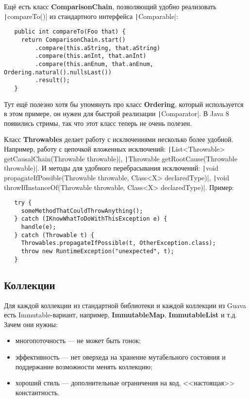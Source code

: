 \documentclass[a5paper,draft]{article}
\begin{document}
Ещё есть класс \textbf{ComparisonChain}, позволяющий удобно реализовать \texttt|compareTo()| из стандартного интерфейса \texttt|Comparable|:

\begin{verbatim}
   public int compareTo(Foo that) {
     return ComparisonChain.start()
         .compare(this.aString, that.aString)
         .compare(this.anInt, that.anInt)
         .compare(this.anEnum, that.anEnum, Ordering.natural().nullsLast())
         .result();
   }
\end{verbatim}

Тут ещё полезно хотя бы упомянуть про класс \textbf{Ordering}, который используется в этом примере, он нужен для быстрой реализации \texttt|Comparator|. В Java 8 появились стримы, так что этот класс теперь не очень полезен.

Класс \textbf{Throwables} делает работу с исключениями несколько более удобной. Например, работу с цепочкой вложенных исключений: \texttt|List<Throwable> getCausalChain(Throwable throwable)|, \texttt|Throwable getRootCause(Throwable throwable)|. И методы для удобного перебрасывания исключений: \texttt|void propagateIfPossible(Throwable throwable, Class<X> declaredType)|, \texttt|void throwIfInstanceOf(Throwable throwable, Class<X> declaredType)|. Пример:
 
\begin{verbatim}
   try {
     someMethodThatCouldThrowAnything();
   } catch (IKnowWhatToDoWithThisException e) {
     handle(e);
   } catch (Throwable t) {
     Throwables.propagateIfPossible(t, OtherException.class);
     throw new RuntimeException("unexpected", t);
   }
\end{verbatim}

\subsection{Коллекции}

Для каждой коллекции из стандартной библиотеки и каждой коллекции из Guava есть Immutable-вариант, например, \textbf{ImmutableMap}, \textbf{ImmutableList} и т.д. Зачем они нужны:
\begin{itemize}
	\item многопоточность --- не может быть гонок;
	\item эффективность --- нет оверхеда на хранение мутабельного состояния и поддержание возможности менять коллекцию;
	\item хороший стиль --- дополнительные ограничения на код, <<настоящая>> константность.
\end{itemize}
\end{document}
